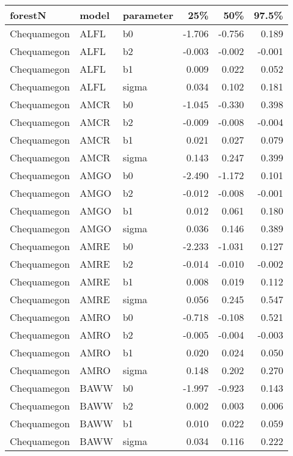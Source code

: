 \begin{table}[ht]
\begin{center}
\begin{tabular}{lllrrr}
  \hline
forestN & model & parameter & 25\% & 50\% & 97.5\% \\ 
  \hline
Chequamegon & ALFL & b0 & -1.706 & -0.756 & 0.189 \\ 
  Chequamegon & ALFL & b2 & -0.003 & -0.002 & -0.001 \\ 
  Chequamegon & ALFL & b1 & 0.009 & 0.022 & 0.052 \\ 
  Chequamegon & ALFL & sigma & 0.034 & 0.102 & 0.181 \\ 
  Chequamegon & AMCR & b0 & -1.045 & -0.330 & 0.398 \\ 
  Chequamegon & AMCR & b2 & -0.009 & -0.008 & -0.004 \\ 
  Chequamegon & AMCR & b1 & 0.021 & 0.027 & 0.079 \\ 
  Chequamegon & AMCR & sigma & 0.143 & 0.247 & 0.399 \\ 
  Chequamegon & AMGO & b0 & -2.490 & -1.172 & 0.101 \\ 
  Chequamegon & AMGO & b2 & -0.012 & -0.008 & -0.001 \\ 
  Chequamegon & AMGO & b1 & 0.012 & 0.061 & 0.180 \\ 
  Chequamegon & AMGO & sigma & 0.036 & 0.146 & 0.389 \\ 
  Chequamegon & AMRE & b0 & -2.233 & -1.031 & 0.127 \\ 
  Chequamegon & AMRE & b2 & -0.014 & -0.010 & -0.002 \\ 
  Chequamegon & AMRE & b1 & 0.008 & 0.019 & 0.112 \\ 
  Chequamegon & AMRE & sigma & 0.056 & 0.245 & 0.547 \\ 
  Chequamegon & AMRO & b0 & -0.718 & -0.108 & 0.521 \\ 
  Chequamegon & AMRO & b2 & -0.005 & -0.004 & -0.003 \\ 
  Chequamegon & AMRO & b1 & 0.020 & 0.024 & 0.050 \\ 
  Chequamegon & AMRO & sigma & 0.148 & 0.202 & 0.270 \\ 
  Chequamegon & BAWW & b0 & -1.997 & -0.923 & 0.143 \\ 
  Chequamegon & BAWW & b2 & 0.002 & 0.003 & 0.006 \\ 
  Chequamegon & BAWW & b1 & 0.010 & 0.022 & 0.059 \\ 
  Chequamegon & BAWW & sigma & 0.034 & 0.116 & 0.222 \\ 

\end{tabular}
\end{center}
\end{table}
